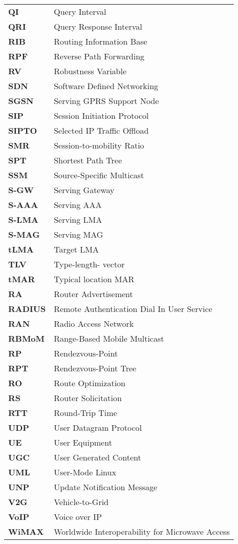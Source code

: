 \begin{center}
\begin{longtable}{p{5cm}p{8.8cm}}
\textbf{QI} & Query Interval\\
\textbf{QRI} & Query Response Interval\\

\textbf{RIB} & Routing Information Base\\
\textbf{RPF} & Reverse Path Forwarding\\
\textbf{RV} & Robustness Variable\\

\textbf{SDN} & Software Defined Networking\\
\textbf{SGSN} & Serving GPRS Support Node\\
\textbf{SIP} & Session Initiation Protocol\\
\textbf{SIPTO} & Selected IP Traffic Offload\\
\textbf{SMR} & Session-to-mobility Ratio \\
\textbf{SPT} & Shortest Path Tree \\
\textbf{SSM} & Source-Specific Multicast\\
\textbf{S-GW} & Serving Gateway\\
\textbf{S-AAA} & Serving AAA\\
\textbf{S-LMA} & Serving LMA\\
\textbf{S-MAG} & Serving MAG\\

\textbf{tLMA} & Target LMA\\
\textbf{TLV} & Type-length- vector\\
\textbf{tMAR} & Typical location MAR\\

\textbf{RA} & Router Advertisement \\
\textbf{RADIUS} & Remote Authentication Dial In User Service\\
\textbf{RAN} & Radio Access Network \\
\textbf{RBMoM} & Range-Based Mobile Multicast  \\
\textbf{RP} & Rendezvous-Point\\
\textbf{RPT} & Rendezvous-Point Tree\\
\textbf{RO} & Route Optimization\\
\textbf{RS} & Router Solicitation\\
\textbf{RTT} & Round-Trip Time\\

\textbf{UDP} & User Datagram Protocol \\
\textbf{UE} & User Equipment \\
\textbf{UGC} & User Generated Content \\
\textbf{UML} & User-Mode Linux\\
\textbf{UNP} & Update Notification Message\\
\textbf{V2G} & Vehicle-to-Grid\\
\textbf{VoIP} & Voice over IP\\
\textbf{WiMAX} & Worldwide Interoperability for Microwave Access\\

\end{longtable}
\end{center}
